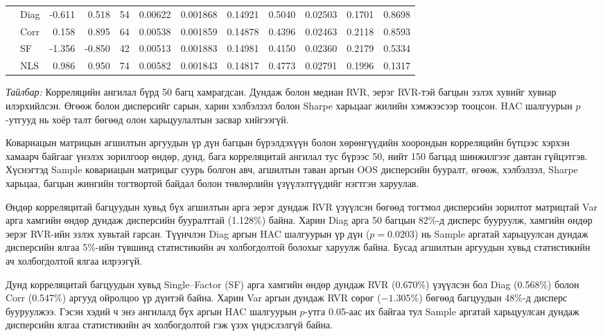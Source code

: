 \begin{table}
\begin{tabular}{llrrrrrrrrrr}
		& Diag
		& -0.611 & 0.518 & 54
		& 0.00622 & 0.001868 & 0.14921
		& 0.5040 & 0.02503 & 0.1701 & 0.8698 \\
		
		& Corr
		& 0.158 & 0.895 & 64
		& 0.00538 & 0.001859 & 0.14878
		& 0.4396 & 0.02463 & 0.2118 & 0.8593 \\
		
		& SF
		& -1.356 & -0.850 & 42
		& 0.00513 & 0.001883 & 0.14981
		& 0.4150 & 0.02360 & 0.2179 & 0.5334 \\
		
		& NLS
		& 0.986 & 0.950 & 74
		& 0.00582 & 0.001843 & 0.14817
		& 0.4773 & 0.02791 & 0.1996 & 0.1317 \\
		\hline
	\end{tabular}
	
	\vspace{2mm}
	\begin{minipage}{0.95\textwidth}
		\footnotesize
		\textit{Тайлбар:}
		Корреляцийн ангилал бүрд 50 багц хамрагдсан.
		Дундаж болон медиан RVR, эерэг RVR-тэй багцын эзлэх хувийг
		хувиар илэрхийлсэн. Өгөөж болон дисперсийг сарын,
		харин хэлбэлзэл болон Sharpe харьцааг жилийн хэмжээсээр
		тооцсон. HAC шалгуурын $p$-утгууд нь хоёр талт бөгөөд
		олон харьцуулалтын засвар хийгээгүй.
	\end{minipage} 
\end{table}

Ковариацын матрицын агшилтын аргуудын үр дүн багцын бүрэлдэхүүн болон хөрөнгүүдийн хоорондын корреляцийн бүтцээс хэрхэн хамаарч байгааг үнэлэх зорилгоор өндөр, дунд, бага корреляцитай ангилал тус бүрээс 50, нийт 150 багцад шинжилгээг давтан гүйцэтгэв. Хүснэгтэд Sample ковариацын матрицыг суурь болгон авч, агшилтын таван аргын OOS дисперсийн бууралт, өгөөж, хэлбэлзэл, Sharpe харьцаа, багцын жингийн тогтвортой байдал болон төвлөрлийн үзүүлэлтүүдийг нэгтгэн харуулав.

Өндөр корреляцитай багцуудын хувьд бүх агшилтын арга эерэг дундаж RVR үзүүлсэн бөгөөд тогтмол дисперсийн зорилтот матрицтай Var арга хамгийн өндөр дундаж дисперсийн бууралттай (1.128\%) байна. Харин Diag арга 50 багцын 82\%-д дисперс бууруулж, хамгийн өндөр эерэг RVR-ийн эзлэх хувьтай гарсан. Түүнчлэн Diag аргын HAC шалгуурын үр дүн (\(p=0.0203\)) нь Sample аргатай харьцуулсан дундаж дисперсийн ялгаа 5\%-ийн түвшинд статистикийн ач холбогдолтой болохыг харуулж байна. Бусад агшилтын аргуудын хувьд статистикийн ач холбогдолтой ялгаа илрээгүй.

Дунд корреляцитай багцуудын хувьд Single--Factor (SF) арга
хамгийн өндөр дундаж RVR (0.670\%) үзүүлсэн бол
Diag (0.568\%) болон Corr (0.547\%) аргууд
ойролцоо үр дүнтэй байна.
Харин Var аргын дундаж RVR сөрөг ($-1.305\%$)
бөгөөд багцуудын 48\%-д дисперс бууруулжээ.
Гэсэн хэдий ч энэ ангилалд бүх аргын HAC шалгуурын
$p$-утга 0.05-аас их байгаа тул Sample аргатай
харьцуулсан дундаж дисперсийн ялгаа статистикийн
ач холбогдолтой гэж үзэх үндэслэлгүй байна.

